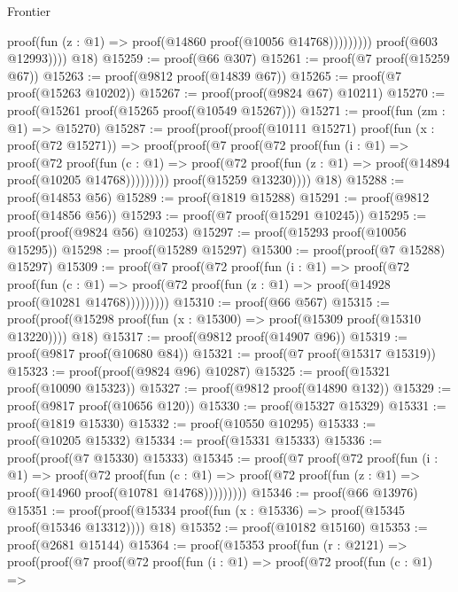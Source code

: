 \begin{lexlean}{Frontier}
\begin{coremodule}
                                proof(fun (z : @1) => proof(@14860 proof(@10056 @14768)))))))))
              proof(@603 @12993))))
      @18)
@15259 := proof(@66 @307)
@15261 := proof(@7 proof(@15259 @67))
@15263 := proof(@9812 proof(@14839 @67))
@15265 := proof(@7 proof(@15263 @10202))
@15267 := proof(proof(@9824 @67) @10211)
@15270 := proof(@15261 proof(@15265 proof(@10549 @15267)))
@15271 := proof(fun (zm : @1) => @15270)
@15287 := proof(proof(proof(@10111 @15271)
        proof(fun (x : proof(@72 @15271)) =>
          proof(proof(@7
                proof(@72
                    proof(fun (i : @1) =>
                      proof(@72
                          proof(fun (c : @1) =>
                            proof(@72
                                proof(fun (z : @1) => proof(@14894 proof(@10205 @14768)))))))))
              proof(@15259 @13230))))
      @18)
@15288 := proof(@14853 @56)
@15289 := proof(@1819 @15288)
@15291 := proof(@9812 proof(@14856 @56))
@15293 := proof(@7 proof(@15291 @10245))
@15295 := proof(proof(@9824 @56) @10253)
@15297 := proof(@15293 proof(@10056 @15295))
@15298 := proof(@15289 @15297)
@15300 := proof(proof(@7 @15288) @15297)
@15309 := proof(@7
      proof(@72
          proof(fun (i : @1) =>
            proof(@72
                proof(fun (c : @1) =>
                  proof(@72 proof(fun (z : @1) => proof(@14928 proof(@10281 @14768)))))))))
@15310 := proof(@66 @567)
@15315 := proof(proof(@15298 proof(fun (x : @15300) => proof(@15309 proof(@15310 @13220)))) @18)
@15317 := proof(@9812 proof(@14907 @96))
@15319 := proof(@9817 proof(@10680 @84))
@15321 := proof(@7 proof(@15317 @15319))
@15323 := proof(proof(@9824 @96) @10287)
@15325 := proof(@15321 proof(@10090 @15323))
@15327 := proof(@9812 proof(@14890 @132))
@15329 := proof(@9817 proof(@10656 @120))
@15330 := proof(@15327 @15329)
@15331 := proof(@1819 @15330)
@15332 := proof(@10550 @10295)
@15333 := proof(@10205 @15332)
@15334 := proof(@15331 @15333)
@15336 := proof(proof(@7 @15330) @15333)
@15345 := proof(@7
      proof(@72
          proof(fun (i : @1) =>
            proof(@72
                proof(fun (c : @1) =>
                  proof(@72 proof(fun (z : @1) => proof(@14960 proof(@10781 @14768)))))))))
@15346 := proof(@66 @13976)
@15351 := proof(proof(@15334 proof(fun (x : @15336) => proof(@15345 proof(@15346 @13312)))) @18)
@15352 := proof(@10182 @15160)
@15353 := proof(@2681 @15144)
@15364 := proof(@15353
      proof(fun (r : @2121) =>
        proof(proof(@7
              proof(@72
                  proof(fun (i : @1) =>
                    proof(@72
                        proof(fun (c : @1) =>

\end{coremodule}
\end{lexlean}
